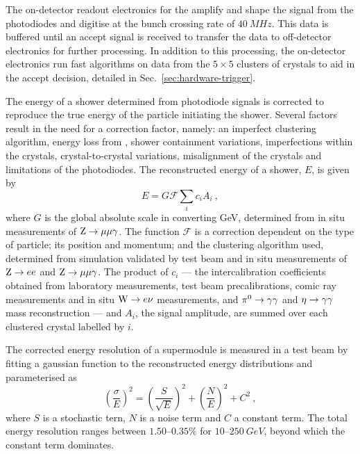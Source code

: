 The on-detector readout electronics for the \ECAL amplify and shape the signal
from the photodiodes and digitise at the bunch crossing rate of
${\SI{40}{MHz}}$. This data is buffered until an accept signal is received to
transfer the data to off-detector electronics for further processing. In
addition to this processing, the on-detector electronics run fast algorithms
on data from the ${5\times 5}$ clusters of crystals to aid in the accept
decision, detailed in Sec.~\ref{sec:hardware-trigger}.

The energy of a shower determined from photodiode signals is corrected to
reproduce the true energy of the particle initiating the shower. Several
factors result in the need for a correction factor, namely: an imperfect
clustering algorithm, energy loss from \brem, shower containment variations,
imperfections within the crystals, crystal-to-crystal variations, misalignment
of the crystals and limitations of the photodiodes. The reconstructed energy
of a shower, $E$, is given by
%
\begin{equation}
    E = G\mathcal{F}\sum_i c_i A_i\ ,
\end{equation}
%
where $G$ is the global absolute scale in converting GeV, determined from in
situ measurements of ${\mathrm{Z}\rightarrow\mu\mu\gamma}$. The function $\mathcal{F}$ is a
correction dependent on the type of particle; its position and momentum; and
the clustering algorithm used, determined from simulation validated by test
beam and in situ measurements of ${\mathrm{Z}\rightarrow ee}$ and ${\mathrm{Z}\rightarrow\mu\mu\gamma}$. The
product of $c_i$ --- the intercalibration coefficients obtained from
laboratory measurements, test beam precalibrations, comic ray measurements and
in situ ${\mathrm{W}\rightarrow e\nu}$ measurements, and ${\pi^{0}\rightarrow\gamma\gamma}$ and
${\eta\rightarrow\gamma\gamma}$ mass reconstruction --- and $A_i$, the signal
amplitude, are summed over each clustered crystal labelled by $i$.

The corrected energy resolution of a supermodule is measured in a test beam by
fitting a gaussian function to the reconstructed energy distributions and
parameterised as
%
\begin{equation}
    \left(\frac{\sigma}{E}\right)^{2} = \left(\frac{S}{\sqrt{E}} \right)^{2}
    + \left( \frac{N}{E} \right)^{2} + C^2\ ,
\end{equation}
%
where $S$ is a stochastic tern, $N$ is a noise term and $C$ a constant term.
The total energy resolution ranges between {$1.50$--$0.35\%$} for
{$10$--$\SI{250}{GeV}$}, beyond which the constant term dominates.


